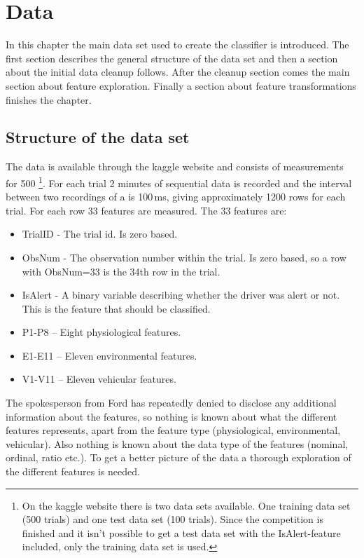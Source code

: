 \chapter{Data}

In this chapter the main data set used to create the classifier is introduced. The first section describes the general structure of the data set and then a section about the initial data cleanup follows. After the cleanup section comes the main section about feature exploration. Finally a section about feature transformations finishes the chapter.


\section{Structure of the data set}

The data is available through the kaggle website \citep{kaggle_data} and consists of measurements for 500 \footnote{On the kaggle website there is two data sets available. One training data set (500 trials) and one test data set (100 trials). Since the competition is finished and it isn't possible to get a test data set with the IsAlert-feature included, only the training data set is used.}. For each trial 2 minutes of sequential data is recorded and the interval between two recordings of a  is 100\,ms, giving approximately 1200 rows for each trial. For each row 33 features are measured. The 33 features are:
\begin{itemize}
    \item TrialID - The trial id. Is zero based.
    \item ObsNum - The observation number within the trial. Is zero based, so a row with ObsNum=33 is the 34th row in the trial.
    \item IsAlert - A binary variable describing whether the driver was alert or not. This is the feature that should be classified.
    \item P1-P8 -- Eight physiological features.
    \item E1-E11 -- Eleven environmental features.
    \item V1-V11 -- Eleven vehicular features.
\end{itemize}
The spokesperson from Ford has repeatedly \citep{kaggle_forum_266,kaggle_forum_317} denied to disclose any additional information about the features, so nothing is known about what the different features represents, apart from the feature type (physiological, environmental, vehicular). Also nothing is known about the data type of the features (nominal, ordinal, ratio etc.). To get a better picture of the data a thorough exploration of the different features is needed.


